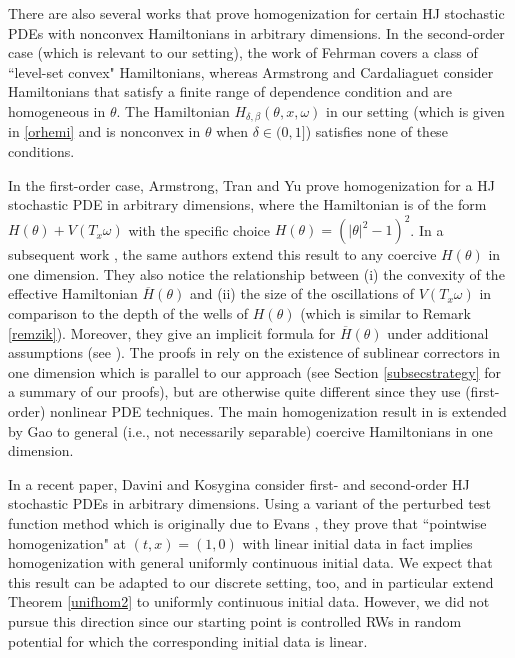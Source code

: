 \documentclass[a4paper]{amsart}
\numberwithin{equation}{section}
\theoremstyle{plain}
\theoremstyle{remark}
\begin{document}
There are also several works that prove homogenization for certain HJ stochastic PDEs with nonconvex Hamiltonians in arbitrary dimensions. In the second-order case (which is relevant to our setting), the work of Fehrman \cite{Feh_preprint} covers a class of ``level-set convex" Hamiltonians, whereas Armstrong and Cardaliaguet \cite{ArmCar_preprint} consider Hamiltonians that satisfy a finite range of dependence condition and are homogeneous in $\theta$. The Hamiltonian $H_{\delta,\beta}(\theta,x,\omega)$ in our setting (which is given in \eqref{orhemi} and is nonconvex in $\theta$ when $\delta\in(0,1]$) satisfies none of these conditions.

In the first-order case, Armstrong, Tran and Yu \cite{ArmTraYu2015} prove homogenization for a HJ stochastic PDE in arbitrary dimensions, where the Hamiltonian is of the form $H(\theta) + V(T_x\omega)$ with the specific choice $H(\theta) = (|\theta|^2 - 1)^2$. In a subsequent work \cite{ArmTraYu2016}, the same authors extend this result to any coercive $H(\theta)$ in one dimension. They also notice the relationship between (i) the convexity of the effective Hamiltonian $\overline H(\theta)$ and (ii) the size of the oscillations of $V(T_x\omega)$ in comparison to the depth of the wells of $H(\theta)$ (which is similar to Remark \ref{remzik}). Moreover, they give an implicit formula for $\overline H(\theta)$ under additional assumptions (see \cite[Lemma 5.2]{ArmTraYu2016}). The proofs in \cite{ArmTraYu2016} rely on the existence of sublinear correctors in one dimension which is parallel to our approach (see Section \ref{subsecstrategy} for a summary of our proofs), but are otherwise quite different since they use (first-order) nonlinear PDE techniques. The main homogenization result in \cite{ArmTraYu2016} is extended by Gao \cite{Gao_preprint} to general (i.e., not necessarily separable) coercive Hamiltonians in one dimension.

In a recent paper, Davini and Kosygina \cite{DavKos_preprint} consider first- and second-order HJ stochastic PDEs in arbitrary dimensions. Using a variant of the perturbed test function method which is originally due to Evans \cite{Eva1989}, they prove that ``pointwise homogenization" at $(t,x) = (1,0)$ with linear initial data in fact implies homogenization with general uniformly continuous initial data. We expect that this result can be adapted to our discrete setting, too, and in particular extend Theorem \ref{unifhom2} to uniformly continuous initial data. However, we did not pursue this direction since our starting point is controlled RWs in random potential for which the corresponding initial data is linear.
\end{document}
